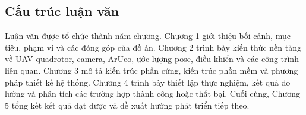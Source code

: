 \subsection{Cấu trúc luận văn}

Luận văn được tổ chức thành năm chương. 
Chương 1 giới thiệu bối cảnh, mục tiêu, phạm vi và các đóng góp của đồ án. 
Chương 2 trình bày kiến thức nền tảng về UAV quadrotor, camera, ArUco, ước lượng pose, điều khiển và các công trình liên quan. 
Chương 3 mô tả kiến trúc phần cứng, kiến trúc phần mềm và phương pháp thiết kế hệ thống. 
Chương 4 trình bày thiết lập thực nghiệm, kết quả đo lường và phân tích các trường hợp thành công hoặc thất bại. Cuối cùng, Chương 5 tổng kết kết quả đạt được và đề xuất hướng phát triển tiếp theo.
